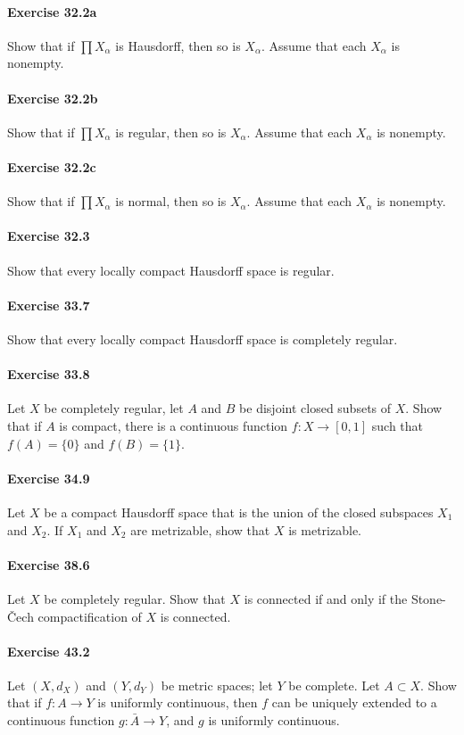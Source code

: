 \documentclass{article}
\begin{document}
\paragraph{Exercise 32.2a} Show that if $\prod X_\alpha$ is Hausdorff, then so is $X_\alpha$. Assume that each $X_\alpha$ is nonempty.


\paragraph{Exercise 32.2b} Show that if $\prod X_\alpha$ is regular, then so is $X_\alpha$. Assume that each $X_\alpha$ is nonempty.


\paragraph{Exercise 32.2c} Show that if $\prod X_\alpha$ is normal, then so is $X_\alpha$. Assume that each $X_\alpha$ is nonempty.


\paragraph{Exercise 32.3} Show that every locally compact Hausdorff space is regular.


\paragraph{Exercise 33.7} Show that every locally compact Hausdorff space is completely regular.


\paragraph{Exercise 33.8} Let $X$ be completely regular, let $A$ and $B$ be disjoint closed subsets of $X$. Show that if $A$ is compact, there is a continuous function $f \colon X \rightarrow [0, 1]$ such that $f(A) = \{0\}$ and $f(B) = \{1\}$.


\paragraph{Exercise 34.9} Let $X$ be a compact Hausdorff space that is the union of the closed subspaces $X_1$ and $X_2$. If $X_1$ and $X_2$ are metrizable, show that $X$ is metrizable.


\paragraph{Exercise 38.6} Let $X$ be completely regular. Show that $X$ is connected if and only if the Stone-Čech compactification of $X$ is connected.


\paragraph{Exercise 43.2} Let $(X, d_X)$ and $(Y, d_Y)$ be metric spaces; let $Y$ be complete. Let $A \subset X$. Show that if $f \colon A \rightarrow Y$ is uniformly continuous, then $f$ can be uniquely extended to a continuous function $g \colon \bar{A} \rightarrow Y$, and $g$ is uniformly continuous.
\end{document}
